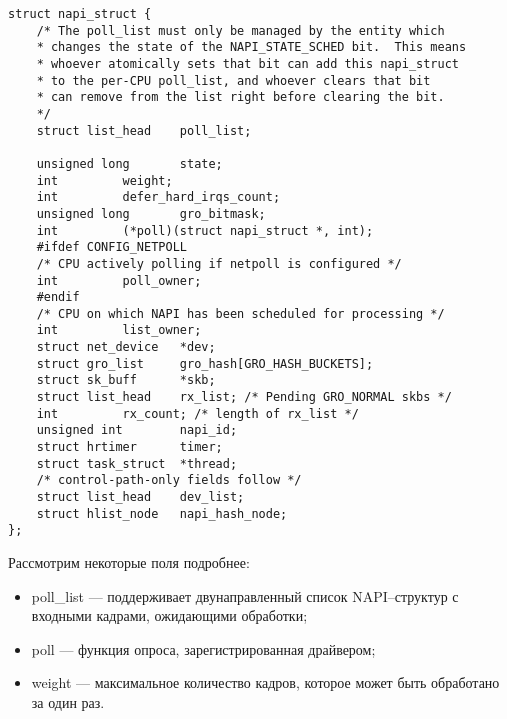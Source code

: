 \begin{center}
	\captionsetup{justification=raggedright,singlelinecheck=off}
	\begin{lstlisting}[label=lst:napi_struct,caption=Структура napi\_struct,showstringspaces=false]
struct napi_struct {
	/* The poll_list must only be managed by the entity which
	* changes the state of the NAPI_STATE_SCHED bit.  This means
	* whoever atomically sets that bit can add this napi_struct
	* to the per-CPU poll_list, and whoever clears that bit
	* can remove from the list right before clearing the bit.
	*/
	struct list_head	poll_list;
	
	unsigned long		state;
	int			weight;
	int			defer_hard_irqs_count;
	unsigned long		gro_bitmask;
	int			(*poll)(struct napi_struct *, int);
	#ifdef CONFIG_NETPOLL
	/* CPU actively polling if netpoll is configured */
	int			poll_owner;
	#endif
	/* CPU on which NAPI has been scheduled for processing */
	int			list_owner;
	struct net_device	*dev;
	struct gro_list		gro_hash[GRO_HASH_BUCKETS];
	struct sk_buff		*skb;
	struct list_head	rx_list; /* Pending GRO_NORMAL skbs */
	int			rx_count; /* length of rx_list */
	unsigned int		napi_id;
	struct hrtimer		timer;
	struct task_struct	*thread;
	/* control-path-only fields follow */
	struct list_head	dev_list;
	struct hlist_node	napi_hash_node;
};
	\end{lstlisting}
\end{center}
\FloatBarrier

Рассмотрим некоторые поля подробнее:
\begin{itemize}[label=---]
	\item poll\_list --- поддерживает двунаправленный список NAPI--структур с входными кадрами, ожидающими обработки;
	\item poll --- функция опроса, зарегистрированная драйвером; 
	\item weight --- максимальное количество кадров, которое может быть обработано за один раз.
\end{itemize}

